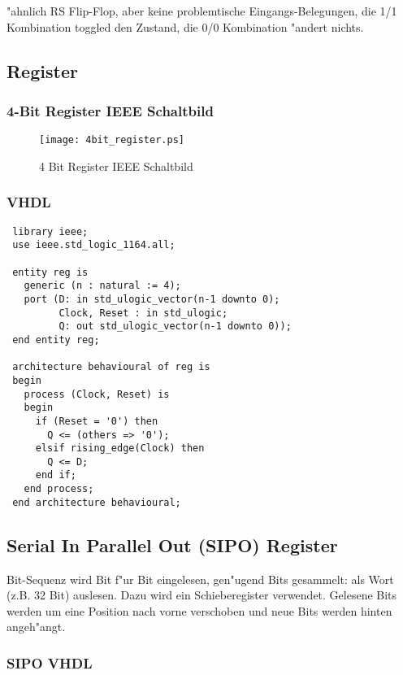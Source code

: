 \documentclass[german, 10pt, a4paper, twocolumn]{scrartcl}
\theoremstyle{definition}
\begin{document}
"ahnlich RS Flip-Flop, aber keine problemtische Eingangs-Belegungen, die 1/1 Kombination toggled den Zustand, die 0/0 Kombination "andert nichts.

\subsection{Register}

\subsubsection{4-Bit Register IEEE Schaltbild}

\begin{figure}[hbt]
 \begin{center}
 	\texttt{[image: 4bit\_register.ps]}
 \end{center}
 \caption{4 Bit Register IEEE Schaltbild}
 \label{4bit_register}
\end{figure}

\subsubsection{VHDL}

\begin{verbatim}
 library ieee;
 use ieee.std_logic_1164.all;

 entity reg is
   generic (n : natural := 4);
   port (D: in std_ulogic_vector(n-1 downto 0);
         Clock, Reset : in std_ulogic;
         Q: out std_ulogic_vector(n-1 downto 0));
 end entity reg;

 architecture behavioural of reg is
 begin
   process (Clock, Reset) is
   begin
     if (Reset = '0') then
       Q <= (others => '0');
     elsif rising_edge(Clock) then
       Q <= D;
     end if;
   end process;
 end architecture behavioural;
\end{verbatim}

\subsection{Serial In Parallel Out (SIPO) Register}

Bit-Sequenz wird Bit f"ur Bit eingelesen, gen"ugend Bits gesammelt: als Wort (z.B. 32 Bit) auslesen. Dazu wird ein Schieberegister verwendet. Gelesene Bits werden um eine Position nach vorne verschoben und neue Bits werden hinten angeh"angt.

\subsubsection{SIPO VHDL}
\end{document}
